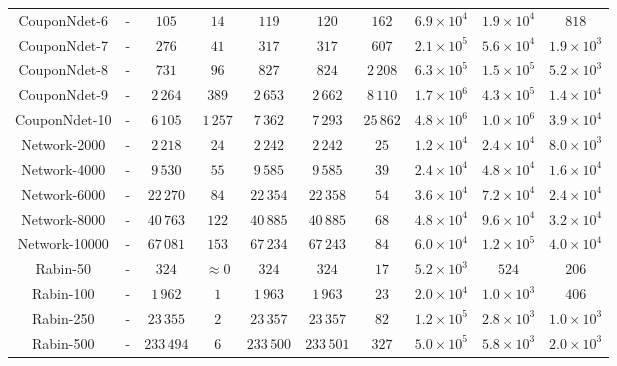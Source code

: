 \begin{table}
\begin{adjustbox}{max width=\textwidth}
\begin{tabu}{c | c | ccc | c | c | c c c}
		\midrule
		CouponNdet-6 & - & $105$ &  {$14$} & {$119$} & {$120$} & $162$ & $6.9 \times 10^4$ & $1.9\times10^4 $ & $818$ \\
		CouponNdet-7 & - & $276$ & {$41$} & {$317$} & {$317$} & $607$ & $2.1 \times 10^5$ & $5.6\times10^4 $ & $1.9\times10^3$ \\
		CouponNdet-8 & - & $731$ & {$96$} & {$827$} & {$824$} & $2\,208$ & $6.3 \times 10^5$ & $1.5\times10^5 $ & $5.2\times10^3$ \\
		CouponNdet-9 & - & $2\,264$ & {$389$} & {$2\,653$} & {$2\,662$} & $8\,110$ & $1.7 \times 10^6$ & $4.3\times10^5 $ & $1.4\times10^4$ \\
		CouponNdet-10 & - & $6\,105$ & {$1\,257$} & {$7\,362$} & {$7\,293$} & $25\,862$ & $4.8 \times 10^6$ & $1.0\times10^6 $ & $3.9\times10^4$ \\
		
		\midrule
		Network-2000 & - & $2\,218$ & {$24$} & {$2\,242$} & {$2\,242$} & $25$ & $1.2 \times 10^4$ & $2.4\times10^4$ & $8.0\times10^3$ \\
		Network-4000 & - & $9\,530$ & {$55$} & {$9\,585$} & {$9\,585$} & $39$ & $2.4 \times 10^4$ & $4.8\times10^4$ & $1.6\times10^4$ \\
		Network-6000 & - & $22\,270$ & {$84$} & {$22\,354$} & {$22\,358$} & $54$ & $3.6 \times 10^4$ & $7.2\times10^4$ & $2.4\times10^4$ \\
		Network-8000 & - & $40\,763$ & {$122$} & {$40\,885$} & {$40\,885$} & $68$ & $4.8 \times 10^4$ & $9.6\times10^4$ & $3.2\times10^4$ \\
		Network-10000 & - & $67\,081$ & {$153$} & {$67\,234$} & {$67\,243$} & $84$ & $6.0 \times 10^4$ & $1.2\times10^5$ & $4.0\times10^4$ \\
		
		\midrule
		Rabin-50 & - & $324$ & {$\approx 0$} & {$ 324$} & {$ 324 $} & $17$ & $5.2 \times 10^3 $ & $524 $ & $206 $ \\
		Rabin-100 & - & $1\,962 $ & {$1$} & {$ 1\,963 $} & {$ 1\,963 $} & $23$ & $2.0 \times 10^4$  & $1.0 \times 10^3 $ & $406 $ \\
		{Rabin-250} & - & $23\,355 $ & {$2$} & {$ 23\,357 $} & {$ 23\,357 $} & $82$ & $1.2 \times 10^5$ & $2.8 \times 10^3 $ & $1.0 \times 10^3$ \\
		{Rabin-500} & - & $233\,494 $ & {$6$} & {$233\,500$} & {$233\,501$} & $327$ & $5.0 \times 10^5$ & $5.8 \times 10^3 $ & $2.0 \times 10^3 $ \\
		

\end{tabu}
\end{adjustbox}
\end{table}
